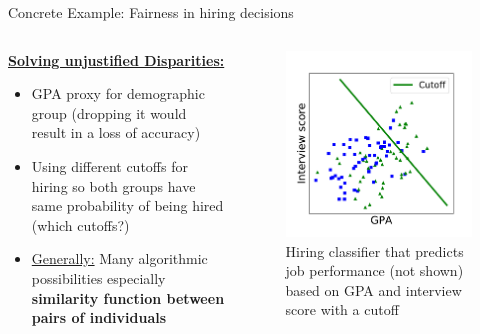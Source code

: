 \begin{frame}{Concrete Example: Fairness in hiring decisions \cite{barocas-hardt-narayanan}}
    \begin{columns}
\begin{column}{0.5\textwidth}
\underline{\textbf{Solving unjustified Disparities:}}\newline 

   \begin{itemize}
       \item GPA proxy for demographic group (dropping it would result in a loss of accuracy)
       \item Using different cutoffs for hiring so both groups have same probability of being hired (which cutoffs?)
       \item \underline{Generally:} Many algorithmic possibilities especially \textbf{similarity function between pairs of individuals}
   \end{itemize}
\end{column}
\begin{column}{0.5\textwidth}  %
    \begin{figure}
        \centering
        \includegraphics[width=.70\textwidth]{presentation/assets/toy_example.pdf}
        \caption{Hiring classifier that predicts job performance (not shown) based on GPA and interview score with a cutoff \cite{barocas-hardt-narayanan}}
        \label{fig:example3}
    \end{figure}
\end{column}
\end{columns}
\end{frame}